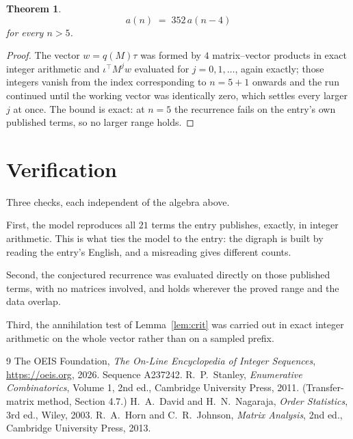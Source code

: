 \documentclass[11pt,a4paper]{article}
\theoremstyle{plain}
\newtheorem{theorem}{Theorem}
\theoremstyle{definition}
\begin{document}
\begin{theorem}
\[
a(n)\;=\;352\,a(n-4)
\]
for every $n>5$.
\end{theorem}

\begin{proof}
The vector $w=q(M)\tau$ was formed by $4$ matrix--vector products in exact integer
arithmetic and $\iota^{\!\top}M^{j}w$ evaluated for $j=0,1,\dots$, again exactly; those
integers vanish from the index corresponding to $n=5+1$ onwards and the run continued
until the working vector was identically zero, which settles every larger $j$ at once. The bound is exact: at $n=5$ the recurrence fails on the entry's own published terms, so no larger range holds.
\end{proof}

\section{Verification}

Three checks, each independent of the algebra above.

First, the model reproduces all $21$ terms the entry publishes, exactly, in integer
arithmetic. This is what ties the model to the entry: the digraph is built by reading the
entry's English, and a misreading gives different counts.

Second, the conjectured recurrence was evaluated directly on those published terms, with no
matrices involved, and holds wherever the proved range and the data overlap.

Third, the annihilation test of Lemma~\ref{lem:crit} was carried out in exact integer
arithmetic on the whole vector rather than on a sampled prefix.

\begin{thebibliography}{9}
 The OEIS Foundation, \emph{The On-Line Encyclopedia of Integer
Sequences}, \url{https://oeis.org}, 2026. Sequence A237242.
 R.~P.~Stanley, \emph{Enumerative Combinatorics}, Volume 1, 2nd ed.,
Cambridge University Press, 2011. (Transfer-matrix method, Section 4.7.)
 H.~A.~David and H.~N.~Nagaraja, \emph{Order Statistics}, 3rd ed., Wiley,
2003.
 R.~A.~Horn and C.~R.~Johnson, \emph{Matrix Analysis}, 2nd ed., Cambridge
University Press, 2013.
\end{thebibliography}
\end{document}
